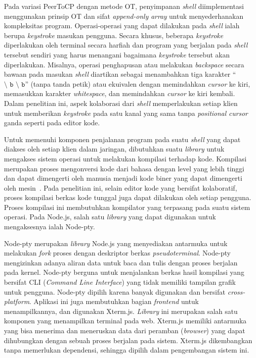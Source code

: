 Pada variasi PeerToCP dengan metode OT, penyimpanan \textit{shell} diimplementasi menggunakan prinsip OT dan sifat \textit{append-only array} untuk menyederhanakan kompleksitas program. Operasi-operasi yang dapat dilakukan pada \textit{shell} ialah berupa \textit{keystroke} masukan pengguna. Secara khusus, beberapa \textit{keystroke} diperlakukan oleh terminal secara harfiah dan program yang berjalan pada \textit{shell} tersebut sendiri yang harus menangani bagaimana \textit{keystroke} tersebut akan diperlakukan. Misalnya, operasi penghapusan atau melakukan \textit{backspace} secara bawaan pada masukan \textit{shell} diartikan sebagai menambahkan tiga karakter ``$\texttt{\char`\\ b \char`\\ b}$'' (tanpa tanda petik) atau ekuivalen dengan memindahkan \textit{cursor} ke kiri, memasukkan karakter \textit{whitespace}, dan memindahkan \textit{cursor} ke kiri kembali. Dalam penelitian ini, aspek kolaborasi dari \textit{shell} memperlakukan setiap klien untuk memberikan \textit{keystroke} pada satu kanal yang sama tanpa \textit{positional cursor} ganda seperti pada editor kode.

Untuk memenuhi komponen penjalanan program pada suatu \textit{shell} yang dapat diakses oleh setiap klien dalam jaringan, dibutuhkan suatu \textit{library} untuk mengakses sistem operasi untuk melakukan kompilasi terhadap kode. Kompilasi merupakan proses mengonversi kode dari bahasa dengan level yang lebih tinggi dan dapat dimengerti oleh manusia menjadi kode biner yang dapat dimengerti oleh mesin~\citep{aho1985compilers}. Pada penelitian ini, selain editor kode yang bersifat kolaboratif, proses kompilasi berkas kode tunggal juga dapat dilakukan oleh setiap pengguna. Proses kompilasi ini membutuhkan kompilator yang terpasang pada suatu sistem operasi. Pada Node.js, salah satu \textit{library} yang dapat digunakan untuk mengaksesnya ialah Node-pty.

Node-pty merupakan \textit{library} Node.js yang menyediakan antarmuka untuk melakukan \textit{fork} proses dengan deskriptor berkas \textit{pseudoterminal}. Node-pty mengizinkan adanya aliran data untuk baca dan tulis dengan proses berjalan pada kernel. Node-pty berguna untuk menjalankan berkas hasil kompilasi yang bersifat CLI (\textit{Command Line Interface}) yang tidak memiliki tampilan grafik untuk pengguna. Node-pty dipilih karena banyak digunakan dan bersifat \textit{cross-platform}. Aplikasi ini juga membutuhkan bagian \textit{frontend} untuk menampilkannya, dan digunakan Xterm.js. \textit{Library} ini merupakan salah satu komponen yang menampilkan terminal pada web. Xterm.js memiliki antarmuka yang bisa menerima dan meneruskan data dari peramban (\textit{browser}) yang dapat dihubungkan dengan sebuah proses berjalan pada sistem. Xterm.js dikembangkan tanpa memerlukan dependensi, sehingga dipilih dalam pengembangan sistem ini.

